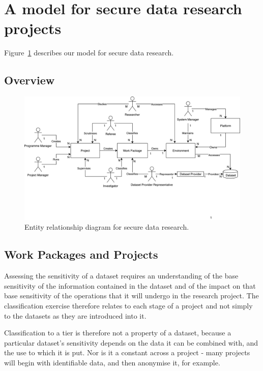 \documentclass[10pt,a4paper,twocolumn]{article}
\begin{document}
\section{A model for secure data research projects}

Figure~\ref{metamodel} describes our model for secure data research.

\subsection{Overview}



\begin{figure}[htbp]
  \centering
  \includegraphics[width=18cm]{dshmodel}
  \caption{\label{metamodel}  Entity relationship diagram for secure data research.}
\end{figure}

\subsection{Work Packages and Projects}
\label{sec:workpackages}

Assessing the sensitivity of a dataset requires an understanding of the base sensitivity of the information contained in the dataset and of the impact on that base sensitivity of the operations that it will undergo in the research project. 
The classification exercise therefore relates to each stage of a project and not simply to the datasets as they are introduced into it.

Classification to a tier is therefore not a property of a dataset, because a particular dataset's sensitivity depends on the data it can be combined with, and the use to which it is put. Nor is it a constant across a project - many projects will begin with identifiable data, and then anonymise it, for example.
\end{document}
